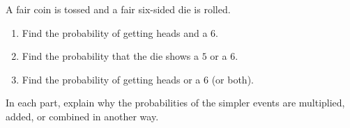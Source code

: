 A fair coin is tossed and a fair six-sided die is rolled.
\begin{enumerate}
\item[(a)] Find the probability of getting heads and a $6$.
\item[(b)] Find the probability that the die shows a $5$ or a $6$.
\item[(c)] Find the probability of getting heads or a $6$ (or both).
\end{enumerate}
In each part, explain why the probabilities of the simpler events are multiplied, added, or combined in another way.
